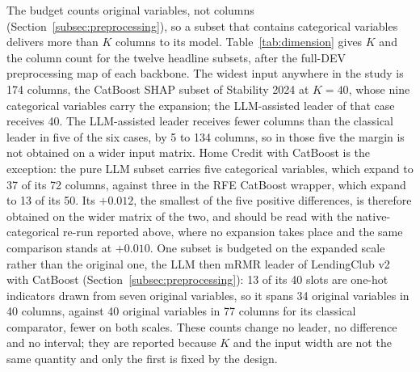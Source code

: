 \documentclass[final,5p,twocolumn]{elsarticle}
\newcommand{\Kfeat}{K}
\providecommand{\DIFdeltex}[1]{{\protect\color{red} \scriptsize #1}} %
\providecommand{\DIFdelbegin}{} %
\providecommand{\DIFdel}[1]{\texorpdfstring{\DIFdeltex{#1}}{}} %
\begin{document}
The \DIFdelbegin \DIFdel{budget counts original variables, not columns (Section~\ref{subsec:preprocessing}), so a subset that contains categorical variables delivers more than $\Kfeat$ columns to its model. Table~\ref{tab:dimension} gives $\Kfeat$ and the column count for the twelve headline subsets, after the full-DEV preprocessing map of each backbone. The widest input anywhere in the study is 174 columns, the CatBoost SHAP subset of Stability 2024 at $\Kfeat=40$, whose nine categorical variables carry the expansion; the LLM-assisted leader of that case receives 40. The LLM-assisted leader receives fewer columns than the classical leader in five of the six cases, by 5 to 134 columns, so in those five the margin is not obtained on a wider input matrix. Home Credit with CatBoost is the exception: the pure LLM subset carries five categorical variables, which expand to 37 of its 72 columns, against three in the RFE CatBoost wrapper, which expand to 13 of its 50. Its $+0.012$, the smallest of the five positive differences, is therefore obtained on the wider matrix of the two, and should be read with the native-categorical re-run reported above, where no expansion takes place and the same comparison stands at $+0.010$. One subset is budgeted on the expanded scale rather than the original one, the LLM then mRMR leader of LendingClub v2 with CatBoost (Section~\ref{subsec:preprocessing}): 13 of its 40 slots are one-hot indicators drawn from seven original variables, so it spans 34 original variables in 40 columns, against 40 original variables in 77 columns for its classical comparator, fewer on both scales. These counts change no leader, no difference and no interval; they are reported because $\Kfeat$ and the input width are not the same quantity and only the first is fixed by the design.
}%
\end{document}
